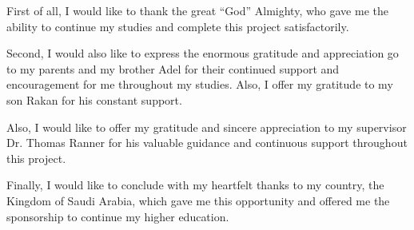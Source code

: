 First of all, I would like to thank the great “God” Almighty, who gave me the ability to continue my studies and complete this project satisfactorily.

Second, I would also like to express the enormous gratitude and appreciation go to my parents and my brother Adel for their continued support and encouragement for me throughout my studies. Also, I offer my gratitude to my son Rakan for his constant support. 

Also, I would like to offer my gratitude and sincere appreciation to my supervisor Dr. Thomas Ranner for his valuable guidance and continuous support throughout this project.

Finally, I would like to conclude with my heartfelt thanks to my country, the Kingdom of Saudi Arabia, which gave me this opportunity and offered me the sponsorship to continue my higher education.
